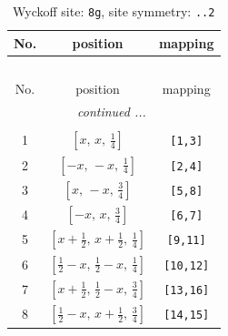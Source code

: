 \documentclass[fleqn,8pt]{jsarticle}
\begin{document}
\renewcommand{\arraystretch}{1.2}
\begin{longtable}{ccc}
\caption{Wyckoff site: {\tt 8g}, site symmetry: {\tt ..2}}
 \\
 \hline \hline
No. & position & mapping \\ \hline \endfirsthead

\multicolumn{2}{l}{\tablename\ \thetable{}} \\
 \hline \hline
No. & position & mapping \\ \hline \endhead

 \hline \hline
\multicolumn{2}{r}{\footnotesize\it continued ...} \\ \endfoot

 \hline \hline
\multicolumn{2}{r}{} \\ \endlastfoot

1 & $\left[ x,\, x,\, \frac{1}{4} \right]$ & {\tt [1,3]} \\ \hline
2 & $\left[ - x,\, - x,\, \frac{1}{4} \right]$ & {\tt [2,4]} \\ \hline
3 & $\left[ x,\, - x,\, \frac{3}{4} \right]$ & {\tt [5,8]} \\ \hline
4 & $\left[ - x,\, x,\, \frac{3}{4} \right]$ & {\tt [6,7]} \\ \hline
5 & $\left[ x + \frac{1}{2},\, x + \frac{1}{2},\, \frac{1}{4} \right]$ & {\tt [9,11]} \\ \hline
6 & $\left[ \frac{1}{2} - x,\, \frac{1}{2} - x,\, \frac{1}{4} \right]$ & {\tt [10,12]} \\ \hline
7 & $\left[ x + \frac{1}{2},\, \frac{1}{2} - x,\, \frac{3}{4} \right]$ & {\tt [13,16]} \\ \hline
8 & $\left[ \frac{1}{2} - x,\, x + \frac{1}{2},\, \frac{3}{4} \right]$ & {\tt [14,15]} \\
\end{longtable}
\renewcommand{\arraystretch}{1.2}
\end{document}

